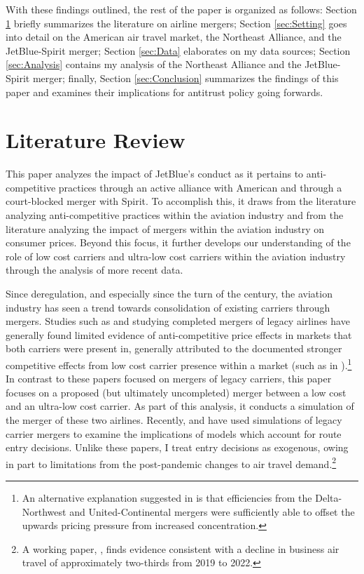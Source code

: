 \documentclass{article}
\begin{document}
	With these findings outlined, the rest of the paper is organized as follows: Section \ref{sec:Literature} briefly summarizes the literature on airline mergers; Section \ref{sec:Setting} goes into detail on the American air travel market, the Northeast Alliance, and the JetBlue-Spirit merger; Section \ref{sec:Data} elaborates on my data sources; Section \ref{sec:Analysis} contains my analysis of the Northeast Alliance and the JetBlue-Spirit merger; finally, Section \ref{sec:Conclusion} summarizes the findings of this paper and examines their implications for antitrust policy going forwards. 
  
	\section{Literature Review}
	\label{sec:Literature}
	
	This paper analyzes the impact of JetBlue's conduct as it pertains to anti-competitive practices through an active alliance with American and through a court-blocked merger with Spirit. To accomplish this, it draws from the literature analyzing anti-competitive practices within the aviation industry and from the literature analyzing the impact of mergers within the aviation industry on consumer prices. Beyond this focus, it further develops our understanding of the role of low cost carriers and ultra-low cost carriers within the aviation industry through the analysis of more recent data.
	
	Since deregulation, and especially since the turn of the century, the aviation industry has seen a trend towards consolidation of existing carriers through mergers. Studies such as \citet{luo_price_2014} and \citet{carlton_are_2019} studying completed mergers of legacy airlines have generally found limited evidence of anti-competitive price effects in markets that both carriers were present in, generally attributed to the documented stronger competitive effects from low cost carrier presence within a market (such as in \citet{morrison_actual_2001, goolsbee_how_2008, shrago_spirit_2024}).\footnote{An alternative explanation suggested in \citet{le_market_2019} is that efficiencies from the Delta-Northwest and United-Continental mergers were sufficiently able to offset the upwards pricing pressure from increased concentration.} In contrast to these papers focused on mergers of legacy carriers, this paper focuses on a proposed (but ultimately uncompleted) merger between a low cost and an ultra-low cost carrier. As part of this analysis, it conducts a simulation of the merger of these two airlines. Recently, \citet{ciliberto_market_2021} and \citet{li_repositioning_2022} have used simulations of legacy carrier mergers to examine the implications of models which account for route entry decisions. Unlike these papers, I treat entry decisions as exogenous, owing in part to limitations from the post-pandemic changes to air travel demand.\footnote{A working paper, \citet{ewen_zoom_2023}, finds evidence consistent with a decline in business air travel of approximately two-thirds from 2019 to 2022.} 
	
\end{document}
